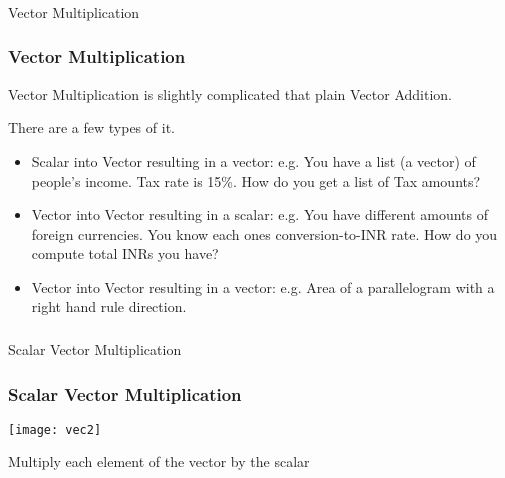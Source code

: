  \begin{frame}[fragile]\frametitle{}
\begin{center}
{\Large Vector Multiplication}
\end{center}
\end{frame}

\begin{frame}[fragile] \frametitle{Vector Multiplication}

Vector Multiplication is slightly complicated that plain Vector Addition. 

There are a few types of it.

\begin{itemize}
\item Scalar into Vector resulting in a vector: e.g. You have a list (a vector) of people's income. Tax rate is 15\%. How do you get a list of Tax amounts?
\item Vector into Vector resulting in a scalar: e.g. You have different amounts of foreign currencies. You know each ones conversion-to-INR rate. How do you compute total INRs you have?
\item Vector into Vector resulting in a vector: e.g. Area of a parallelogram with a right hand rule direction.
\end{itemize}

\end{frame}


 \begin{frame}[fragile]\frametitle{}
\begin{center}
{\Large Scalar Vector Multiplication}
\end{center}
\end{frame}


 \begin{frame}[fragile] \frametitle{Scalar Vector Multiplication}

\begin{center}
\texttt{[image: vec2]}
\end{center}

Multiply each element of the vector by the scalar
 
\end{frame}

